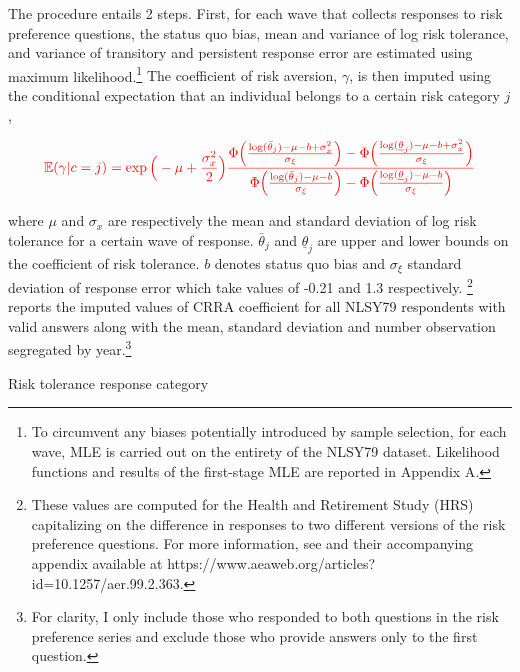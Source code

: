 \documentclass[]{article}
\begin{document}
The procedure entails 2 steps. First, for each wave that collects responses to risk preference questions, the status quo bias, mean and variance of log risk tolerance, and variance of transitory and persistent response error are estimated using maximum likelihood.\footnote{To circumvent any biases potentially introduced by sample selection, for each wave, MLE is carried out on the entirety of the NLSY79 dataset. Likelihood functions and results of the first-stage MLE are reported in \alert{Appendix A}.} \alert{The coefficient of risk aversion, $\gamma$, is then imputed using the conditional expectation that an individual belongs to a certain risk category $j$,}

\begin{equation}
	\color{red}\mathbb E(\gamma|c=j)=\exp\Big(-\mu+{\sigma_x^2\over 2}\Big){\Phi\Big({\log(\bar{\theta}_j)-\mu-b+\sigma_x^2\over \sigma_{\xi}}\Big)-\Phi\Big({\log(\underline{\theta}_j)-\mu-b+\sigma_x^2\over \sigma_{\xi}}\Big)\over \Phi\Big({\log(\bar{\theta}_j)-\mu-b\over \sigma_\xi}\Big)-\Phi\Big({\log(\underline{\theta}_j)-\mu-b\over \sigma_\xi}\Big)}
	\label{eq:1-conditional-expectation}
\end{equation}

\alert{where $\mu$ and $\sigma_x$ are respectively the mean and standard deviation of log risk tolerance for a certain wave of response. $\bar \theta_j$ and $\underline{\theta}_j$ are upper and lower bounds on the coefficient of risk tolerance. $b$ denotes status quo bias and $\sigma_\xi$ standard deviation of response error which take values of -0.21 and 1.3 respectively. \footnote{These values are computed for the Health and Retirement Study (HRS) capitalizing on the difference in responses to two different versions of the risk preference questions. For more information, see \citet{kimball2009risk} and their accompanying appendix available at https://www.aeaweb.org/articles?id=10.1257/aer.99.2.363.}  reports the imputed values of CRRA coefficient for all NLSY79 respondents with valid answers along with the mean, standard deviation and number observation segregated by year.\footnote{For clarity, I only include those who responded to both questions in the risk preference series and exclude those who provide answers only to the first question.} }

\begin{table}[!t]
	\centering
	\setlength{\extrarowheight}{0.3em}
	\caption{Risk tolerance response category}	
	
	\label{table:2-risk-bound}
\end{table}
\end{document}
